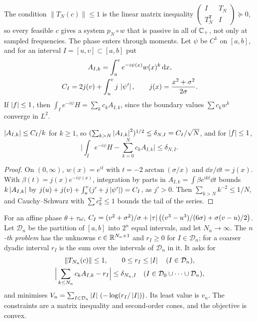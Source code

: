 The condition $\|T_N(c)\|\le1$ is the linear matrix inequality
$\left(\begin{smallmatrix}I&T_N\\T_N^{\mathsf T}&I\end{smallmatrix}\right)\succeq0$,
so every feasible $c$ gives a system $p_N\circ w$ that is passive in all of
$\mathbb C_{+}$, not only at sampled frequencies. The phase enters through moments.
Let $\psi$ be $C^1$ on $[a,b]$, and for an interval $I=[u,v]\subset[a,b]$ put
\begin{gather*}
A_{I,k}=\int_u^ve^{-i\psi(x)}w(x)^k\,\mathrm d x,\\
C_I=2j(v)+\int_u^vj\,\left|\psi'\right|,\qquad j(x)=\frac{x^2+\sigma^2}{2\sigma}.
\end{gather*}
If $\left|f\right|\le1$, then $\int_Ie^{-i\psi}H=\sum_kc_kA_{I,k}$, since the boundary
values $\sum c_kw^k$ converge in $L^2$.

\begin{lemma}\label{lem:tail}
$\left|A_{I,k}\right|\le C_I/k$ for $k\ge1$, so
$(\sum_{k>N}\left|A_{I,k}\right|^2)^{1/2}\le\delta_{N,I}=C_I/\sqrt N$, and for
$\left|f\right|\le1$,
\[
\Big|\int_Ie^{-i\psi}H-\sum_{k=0}^Nc_kA_{I,k}\Big|\le\delta_{N,I} .
\]
\end{lemma}

\begin{proof}
On $(0,\infty)$, $w(x)=e^{it}$ with $t=-2\arctan(\sigma/x)$ and $\dd x/\dd t=j(x)$.
With $\beta(t)=j(x)e^{-i\psi(x)}$, integration by parts in
$A_{I,k}=\int\beta e^{ikt}\dd t$ bounds $k\left|A_{I,k}\right|$ by
$j(u)+j(v)+\int_u^v(j'+j\left|\psi'\right|)=C_I$, as $j'>0$. Then
$\sum_{k>N}k^{-2}\le1/N$, and Cauchy--Schwarz with $\sum c_k^2\le1$ bounds the
tail of the series.
\end{proof}

For an affine phase $\theta+\tau\omega$,
$C_I=(v^2+\sigma^2)/\sigma+\left|\tau\right|\big((v^3-u^3)/(6\sigma)+\sigma(v-u)/2\big)$.
Let $\mathcal D_n$ be the partition of $[a,b]$ into $2^n$ equal intervals, and
let $N_n\to\infty$. The \emph{$n$-th problem} has the unknowns
$c\in\mathbb R^{N_n+1}$ and $r_I\ge0$ for $I\in\mathcal D_n$; for a coarser dyadic
interval $r_I$ is the sum over the intervals of $\mathcal D_n$ in it. It asks
for
\begin{gather*}
\|T_{N_n}(c)\|\le1,\qquad0\le r_I\le\left|I\right|\quad(I\in\mathcal D_n),\\
\Big|\sum_{k\le N_n}c_kA_{I,k}-r_I\Big|\le\delta_{N_n,I}\quad(I\in\mathcal D_0\cup\dots\cup\mathcal D_n),
\end{gather*}
and minimises $V_n=\sum_{I\in\mathcal D_n}\left|I\right|\,(-\log(r_I/\left|I\right|))$. Its least
value is $v_n$. The constraints are a matrix inequality and second-order
cones, and the objective is convex.

